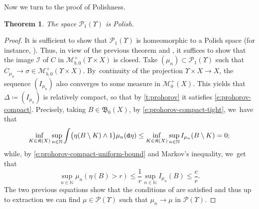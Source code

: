 \documentclass[10pt]{amsart}
\newtheorem{theorem}{Theorem}[section]
\theoremstyle{definition}
\theoremstyle{remark}
\DeclarePairedDelimiter{\paren}{\lparen}{\rparen}
\begin{document}
Now we turn to the proof of Polishness.

\begin{theorem}\label{t:p1-polish}
The space $\mathscr{P}_{1}(\varUpsilon)$ is Polish.
\end{theorem}
\begin{proof}
It is sufficient to show that $\mathscr{P}_{1}(\varUpsilon)$ is homeomorphic to a Polish space (for instance, \cite[IX, p.\,58, Cor.\,2]{BourbakiTopo2}).
Thus, in view of the previous theorem and \cite[IX, p.\,57, Prop.\,1]{BourbakiTopo2}, it suffices to show that the image $\mathscr{I}$ of $C$ in $\mathscr{M}^{+}_{b,0}(\varUpsilon \times X)$ is closed.
Take $(\mu_{n}) \subset \mathscr{P}_{1}(\varUpsilon)$ such that $C_{\mu_{n}} \to \sigma \in \mathscr{M}^{+}_{b,0}(\varUpsilon \times X)$.
By~continuity of the projection $\varUpsilon \times X \to X$, the sequence $(I_{\mu_{n}})$ also converges to some measure in $\mathscr{M}^{+}_{0}(X)$.
This yields that $\Delta \coloneq (I_{\mu_{n}})$ is relatively compact, so that by \cref{t:prohorov} it satisfies \cref{e:prohorov-compact}.
Precisely, taking $B \in \mathfrak{B}_{0}(X)$, by \cref{e:prohorov-compact-tight}, we~have that
\begin{equation*}
\inf_{K \in \mathfrak{K}(X)} \sup_{n \in \mathbb{N}} \int \paren[\big]{\eta(B \setminus K) \wedge 1} \mu_{n}(\mathtt{d} \eta) \leq \inf_{K \in \mathfrak{K}(X)} \sup_{n \in \mathbb{N}} I_{\mu_{n}}(B \setminus K) = 0;
\end{equation*}
while, by \cref{e:prohorov-compact-uniform-bound} and Markov's inequality, we~get that
\begin{equation*}
\sup_{n \in \mathbb{N}} \mu_{n}(\eta(B) > r) \leq \frac{1}{r} \sup_{n \in \mathbb{N}} I_{\mu_{n}}(B) \leq \frac{c}{r}.
\end{equation*}
The two previous equations show that the conditions of \cite[Th.\,4.10]{Kallenberg} are satisfied and thus up to extraction we can find $\mu \in \mathscr{P}(\varUpsilon)$ such that $\mu_{n} \to \mu$ in $\mathscr{P}(\varUpsilon)$.


\end{proof}
\end{document}
